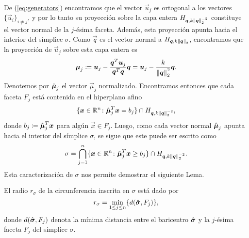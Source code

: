 De (\ref{eq:generators}) encontramos que el vector $\vec{u}_j$ es ortogonal a los vectores $\lbrace
\vec{u}_i \rbrace_{i \neq j}$, y por lo tanto su proyección sobre la capa entera $H_{\boldsymbol{q},
k\left\lVert \boldsymbol{q} \right\rVert_2^{-2}}$ constituye el vector normal de la $j$-ésima faceta. Además, esta proyección
apunta hacia el interior del símplice $\sigma$. Como $\vec{q}$ es el vector normal a $H_{\boldsymbol{q},
k\left\lVert \boldsymbol{q} \right\rVert_2}$, encontramos que la proyección de $\vec{u}_j$ sobre esta capa entera es
\begin{equation}
	\label{eq:normal-vector}
	\boldsymbol{\mu}_j \coloneq
	\boldsymbol{u}_j - \frac{\boldsymbol{q}^T\boldsymbol{u}_j}{\boldsymbol{q}^T\boldsymbol{q}}\boldsymbol{q}
	=
	\boldsymbol{u}_j - \frac{k}{\left\lVert \boldsymbol{q} \right\rVert_2^2}\boldsymbol{q}.
\end{equation}
Denotemos por $\hat{\boldsymbol{ \mu }}_j$ el vector $\vec{\mu}_j$ normalizado. Encontramos entonces que cada
faceta $F_j$ está contenida en el hiperplano afino
\begin{equation*}
	\lbrace \boldsymbol{x} \in \mathbb{R}^{n} \colon \hat{\boldsymbol{ \mu }}_j^T\boldsymbol{x} = b_j \rbrace
	\cap H_{\boldsymbol{q}, k\left\lVert \boldsymbol{q} \right\rVert_2^{-2}},
\end{equation*}
donde $b_j \coloneq \hat{\boldsymbol{ \mu }}_j^T\boldsymbol{x}$ para algún $\vec{x} \in F_j$. Luego, como cada
vector normal $\hat{\boldsymbol{ \mu }}_j$ apunta hacia el interior del símplice $\sigma$, se sigue que este puede
ser escrito como
\begin{equation*}
	\sigma = \bigcap_{j=1}^{n} \lbrace \boldsymbol{x} \in \mathbb{R}^{n} \colon \hat{\boldsymbol{ \mu }}^T_j\boldsymbol{x} \geq b_j
	\rbrace \cap H_{\boldsymbol{q}, k\left\lVert \boldsymbol{q} \right\rVert_2^{-2}}.
\end{equation*}
Esta caracterización de $\sigma$ nos permite demostrar el siguiente Lema.
\begin{lemma}
	\label{lemma:sigma-radius}
	El radio $r_\sigma$ de la circunferencia inscrita en $\sigma$ está dado por
	\begin{equation*}
		r_\sigma = \min_{1 \leq j \leq n} \lbrace d(\hat{\boldsymbol{ \sigma }}, F_j) \rbrace,
	\end{equation*}
	donde $d(\hat{\boldsymbol{ \sigma }}, F_j)$ denota la mínima distancia entre el baricentro
	$\hat{\boldsymbol{ \sigma }}$ y la $j$-ésima faceta $F_j$ del símplice $\sigma$.
\end{lemma}
